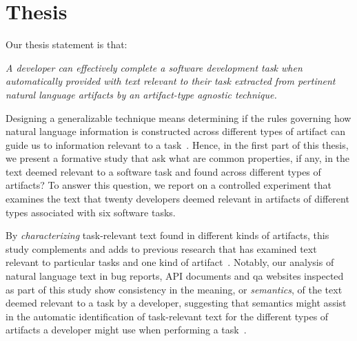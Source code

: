 

\section{Thesis}
\label{cp1:thesis}




Our thesis statement is that:




\bigskip
\begin{bluequote}
    \textit{A developer can effectively complete a software development task when automatically provided with text relevant to their task extracted from pertinent natural language artifacts
    by an artifact-type agnostic technique.}
\end{bluequote}
\medskip



Designing a generalizable technique means 
determining if the rules governing how natural language information is constructed across different types of artifact
can guide us to information relevant to a task~\cite{Kintsch1978a}.
Hence, in the first part of this thesis, 
we present a formative study that ask what are common properties, if any, in the text deemed relevant to a software task and found across different types of artifacts?
To answer this question, we report on a controlled experiment that 
examines the text that twenty developers deemed relevant in artifacts 
of different types associated with six software tasks.


By \textit{characterizing} task-relevant text found in different kinds of artifacts,
this study complements and adds to previous research that has
examined text relevant to particular tasks and one kind of artifact~\cite{Ko2006, Rastkar2010, Chaparro2017, Robillard2015}.
Notably, our analysis of natural language text  in bug
reports, API documents and \ac{qa} websites 
inspected as part of this study 
 show consistency in the meaning, or \textit{semantics}, of the
 text deemed relevant to a task by a developer, suggesting that 
semantics might assist in the automatic identification of
task-relevant text for the different types of artifacts a developer 
might use when performing a task~\cite{Meyer2019, Li2013}.




